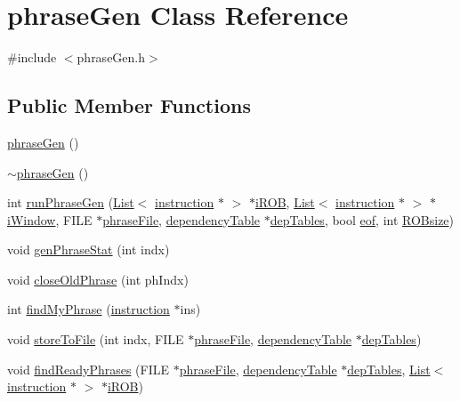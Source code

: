 \hypertarget{classphraseGen}{
\section{phraseGen Class Reference}
\label{classphraseGen}
}


{\ttfamily \#include $<$phraseGen.h$>$}

\subsection*{Public Member Functions}
\begin{DoxyCompactItemize}
\item 
\hyperlink{classphraseGen_a94e47ed50271fd9e5f5335a1160b7216}{phraseGen} ()
\item 
\hyperlink{classphraseGen_a348ab4d28c08b7e77241cd0c7a0f3796}{$\sim$phraseGen} ()
\item 
int \hyperlink{classphraseGen_a27c8b0d81592bc45e7f25e9cb7a4d1c4}{runPhraseGen} (\hyperlink{classList}{List}$<$ \hyperlink{classinstruction}{instruction} $\ast$ $>$ $\ast$\hyperlink{backend_2parser_8cpp_ad73ae25f81e6e99482f3fbd5ba9664ce}{iROB}, \hyperlink{classList}{List}$<$ \hyperlink{classinstruction}{instruction} $\ast$ $>$ $\ast$\hyperlink{backend_2parser_8cpp_a901b5b3874c558101a1c250f2f2d0662}{iWindow}, FILE $\ast$\hyperlink{bkEnd_8cpp_a77fc2d35c5f7077be762435e06e16bd2}{phraseFile}, \hyperlink{classdependencyTable}{dependencyTable} $\ast$\hyperlink{vliwScheduler_8cpp_ab1dae06b10269a1b683512c8ecb25def}{depTables}, bool \hyperlink{backend_2parser_8cpp_a6c052602d1d43227768ad3807f7b7268}{eof}, int \hyperlink{bkEnd_8cpp_a06a6e046fd7b9a66b03d334b1df5e3ad}{ROBsize})
\item 
void \hyperlink{classphraseGen_a8aa6ac2c304d3545c10da7c70ae6445d}{genPhraseStat} (int indx)
\item 
void \hyperlink{classphraseGen_a35e9879ba8c8931661e112c579ead2b4}{closeOldPhrase} (int phIndx)
\item 
int \hyperlink{classphraseGen_a04d54cfe18dfef407499f3e6829c32d3}{findMyPhrase} (\hyperlink{classinstruction}{instruction} $\ast$ins)
\item 
void \hyperlink{classphraseGen_aba7134610613016de2d7d91d47c5dd4e}{storeToFile} (int indx, FILE $\ast$\hyperlink{bkEnd_8cpp_a77fc2d35c5f7077be762435e06e16bd2}{phraseFile}, \hyperlink{classdependencyTable}{dependencyTable} $\ast$\hyperlink{vliwScheduler_8cpp_ab1dae06b10269a1b683512c8ecb25def}{depTables})
\item 
void \hyperlink{classphraseGen_ab1fd52686e66bea06bd08d7fc8a4eb23}{findReadyPhrases} (FILE $\ast$\hyperlink{bkEnd_8cpp_a77fc2d35c5f7077be762435e06e16bd2}{phraseFile}, \hyperlink{classdependencyTable}{dependencyTable} $\ast$\hyperlink{vliwScheduler_8cpp_ab1dae06b10269a1b683512c8ecb25def}{depTables}, \hyperlink{classList}{List}$<$ \hyperlink{classinstruction}{instruction} $\ast$ $>$ $\ast$\hyperlink{backend_2parser_8cpp_ad73ae25f81e6e99482f3fbd5ba9664ce}{iROB})

\end{DoxyCompactItemize}
